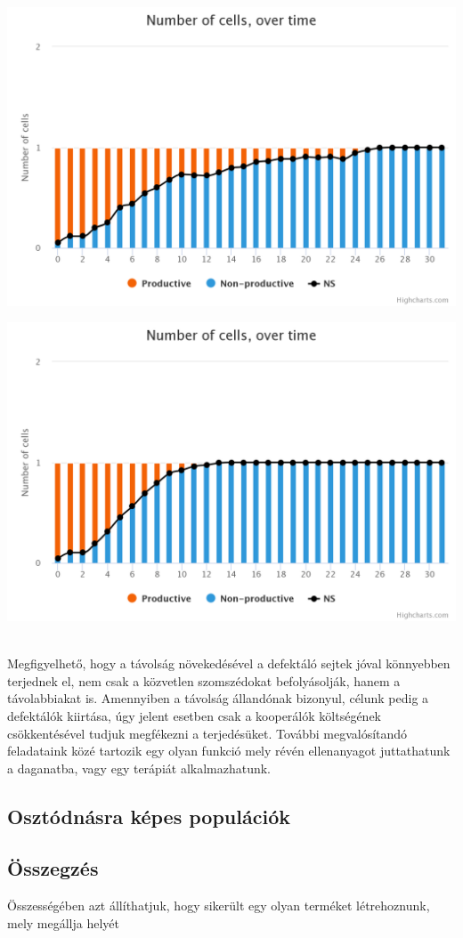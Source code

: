 \begin{minipage}{\linewidth}
	\centering
	\begin{multicols}{2}
		\begin{Figure}
			\centering
			\includegraphics[width=\linewidth]{images/diffdist2}
		\end{Figure}
		\begin{Figure}
			\centering
			\includegraphics[width=\linewidth]{images/diffdist5}
		\end{Figure}
	\end{multicols}
\end{minipage}\\


Megfigyelhető, hogy a távolság növekedésével a defektáló sejtek jóval könnyebben terjednek el, nem csak a közvetlen szomszédokat befolyásolják, hanem a távolabbiakat is. Amennyiben a távolság állandónak bizonyul, célunk pedig a defektálók kiirtása, úgy jelent esetben csak a kooperálók költségének csökkentésével tudjuk megfékezni a terjedésüket. További megvalósítandó feladataink közé tartozik egy olyan funkció mely révén ellenanyagot juttathatunk a daganatba, vagy egy terápiát alkalmazhatunk.

\subsection{Osztódnásra képes populációk}



\subsection{Összegzés}

Összességében azt állíthatjuk, hogy sikerült egy olyan terméket létrehoznunk, mely megállja helyét
